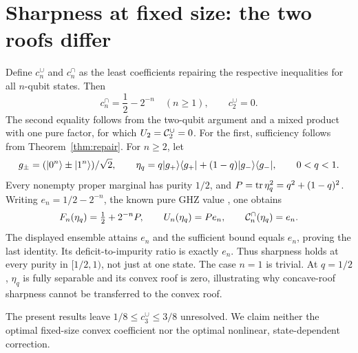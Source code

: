 \section{Sharpness at fixed size: the two roofs differ}
Define $c_n^\cup$ and $c_n^\cap$ as the least coefficients repairing the respective inequalities for all $n$-qubit states. Then
\begin{equation}\label{eq:capsharp}
c_n^\cap=\frac12-2^{-n}\quad(n\geq1),\qquad c_2^\cup=0.
\end{equation}
The second equality follows from the two-qubit argument and a mixed product with one pure factor, for which $U_2=\mathcal C_2^\cup=0$. For the first, sufficiency follows from Theorem~\ref{thm:repair}. For $n\geq2$, let
\[
g_\pm=(\lvert 0^n\rangle\pm\lvert 1^n\rangle)/\sqrt2,\qquad
\eta_q=q\lvert g_+\rangle\langle g_+\rvert+(1-q)\lvert g_-\rangle\langle g_-\rvert,\qquad 0<q<1.
\]
Every nonempty proper marginal has purity $1/2$, and $P=\operatorname{tr}\eta_q^2=q^2+(1-q)^2$. Writing $e_n=1/2-2^{-n}$, the known pure GHZ value \cite{schatzki2024}, one obtains
\[
F_n(\eta_q)=\tfrac12+2^{-n}P,\qquad U_n(\eta_q)=Pe_n,
\qquad\mathcal C_n^\cap(\eta_q)=e_n.
\]
The displayed ensemble attains $e_n$ and the sufficient bound equals $e_n$, proving the last identity. Its deficit-to-impurity ratio is exactly $e_n$. Thus sharpness holds at every purity in $[1/2,1)$, not just at one state. The case $n=1$ is trivial. At $q=1/2$, $\eta_q$ is fully separable and its convex roof is zero, illustrating why concave-roof sharpness cannot be transferred to the convex roof.

The present results leave $1/8\leq c_3^\cup\leq3/8$ unresolved. We claim neither the optimal fixed-size convex coefficient nor the optimal nonlinear, state-dependent correction.
